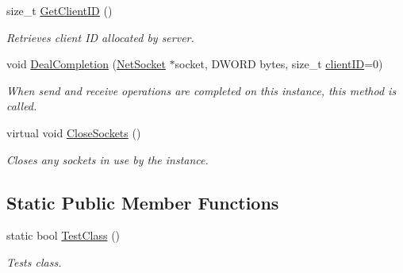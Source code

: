 \begin{DoxyCompactItemize}
size\_\-t \hyperlink{class_net_instance_client_a4eb551374eb94ebd3e77e58291ed9549}{GetClientID} ()
\begin{DoxyCompactList}\small\item\em Retrieves client ID allocated by server. \item\end{DoxyCompactList}\item 
void \hyperlink{class_net_instance_client_a71c2b11a56a18ae3b1c3a76390776ee9}{DealCompletion} (\hyperlink{class_net_socket}{NetSocket} $\ast$socket, DWORD bytes, size\_\-t \hyperlink{class_net_instance_client_abc188a88da7ab851bc3ac4d9287fe342}{clientID}=0)
\begin{DoxyCompactList}\small\item\em When send and receive operations are completed on this instance, this method is called. \item\end{DoxyCompactList}\item 
virtual void \hyperlink{class_net_instance_client_a6d9671a1416d1de06d8013ec02d78692}{CloseSockets} ()
\begin{DoxyCompactList}\small\item\em Closes any sockets in use by the instance. \item\end{DoxyCompactList}\end{DoxyCompactItemize}
\subsection*{Static Public Member Functions}
\begin{DoxyCompactItemize}
\item 
static bool \hyperlink{class_net_instance_client_a90bfd05103f12264ee2293ccd71081f4}{TestClass} ()
\begin{DoxyCompactList}\small\item\em Tests class. \item\end{DoxyCompactList}\end{DoxyCompactItemize}
